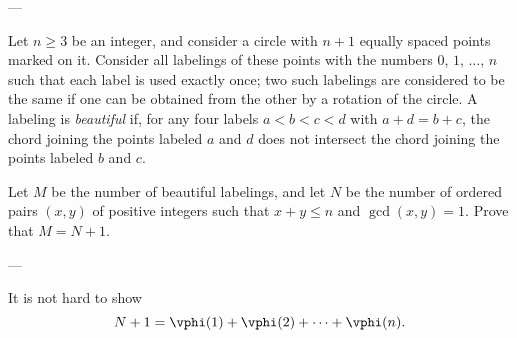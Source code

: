 
---

Let $n\ge3$ be an integer, and consider a circle with $n+1$ equally spaced points marked on it. Consider all labelings of these points with the numbers $0$, $1$, $\ldots$, $n$ such that each label is used exactly once; two such labelings are considered to be the same if one can be obtained from the other by a rotation of the circle. A labeling is \emph{beautiful} if, for any four labels $a<b<c<d$ with $a+d=b+c$, the chord joining the points labeled $a$ and $d$ does not intersect the chord joining the points labeled $b$ and $c$.

Let $M$ be the number of beautiful labelings, and let $N$ be the number of ordered pairs $(x,y)$ of positive integers such that $x+y\le n$ and $\gcd(x,y)=1$. Prove that $M=N+1$.

---

It is not hard to show \[N+1=\vphi(1)+\vphi(2)+\cdots+\vphi(n).\]

